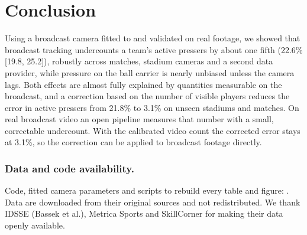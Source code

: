 \documentclass[runningheads]{llncs}
\begin{document}
\section{Conclusion}

Using a broadcast camera fitted to and validated on real footage, we showed that broadcast tracking undercounts a
team's active pressers by about one fifth (22.6\% [19.8, 25.2]), robustly across matches, stadium cameras and a second
data provider, while pressure on the ball carrier is nearly unbiased unless the camera lags. Both effects are almost
fully explained by quantities measurable on the broadcast, and a correction based on the number of visible players
reduces the error in active pressers from 21.8\% to 3.1\% on unseen stadiums and matches. On real broadcast video an
open pipeline measures that number with a small, correctable undercount. With the calibrated video count the
corrected error stays at 3.1\%, so the correction can be applied to broadcast footage directly.

\subsubsection*{Data and code availability.}
Code, fitted camera parameters and scripts to rebuild every table and figure: \cite{pitchlens}. Data are downloaded
from their original sources and not redistributed. We thank IDSSE (Bassek et al.), Metrica Sports and SkillCorner for
making their data openly available.



\end{document}
